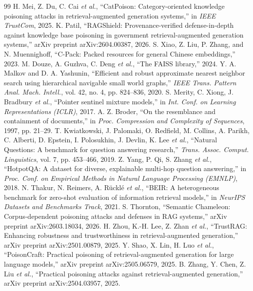 \documentclass[10pt,journal,compsoc]{IEEEtran}
\begin{document}
\begin{thebibliography}{99}
 H. Mei, Z. Du, C. Cai \emph{et al.}, ``CatPoison: Category-oriented knowledge poisoning attacks in retrieval-augmented generation systems,'' in \emph{IEEE TrustCom}, 2025.
 K. Patil, ``RAGShield: Provenance-verified defense-in-depth against knowledge base poisoning in government retrieval-augmented generation systems,'' arXiv preprint arXiv:2604.00387, 2026.
 S. Xiao, Z. Liu, P. Zhang, and N. Muennighoff, ``C-Pack: Packed resources for general Chinese embeddings,'' 2023.
 M. Douze, A. Guzhva, C. Deng \emph{et al.}, ``The FAISS library,'' 2024.
 Y. A. Malkov and D. A. Yashunin, ``Efficient and robust approximate nearest neighbor search using hierarchical navigable small world graphs,'' \emph{IEEE Trans. Pattern Anal. Mach. Intell.}, vol. 42, no. 4, pp. 824--836, 2020.
 S. Merity, C. Xiong, J. Bradbury \emph{et al.}, ``Pointer sentinel mixture models,'' in \emph{Int. Conf. on Learning Representations (ICLR)}, 2017.
 A. Z. Broder, ``On the resemblance and containment of documents,'' in \emph{Proc. Compression and Complexity of Sequences}, 1997, pp. 21--29.
 T. Kwiatkowski, J. Palomaki, O. Redfield, M. Collins, A. Parikh, C. Alberti, D. Epstein, I. Polosukhin, J. Devlin, K. Lee \emph{et al.}, ``Natural Questions: A benchmark for question answering research,'' \emph{Trans. Assoc. Comput. Linguistics}, vol. 7, pp. 453--466, 2019.
 Z. Yang, P. Qi, S. Zhang \emph{et al.}, ``HotpotQA: A dataset for diverse, explainable multi-hop question answering,'' in \emph{Proc. Conf. on Empirical Methods in Natural Language Processing (EMNLP)}, 2018.
 N. Thakur, N. Reimers, A. R\"{u}ckl\'{e} \emph{et al.}, ``BEIR: A heterogeneous benchmark for zero-shot evaluation of information retrieval models,'' in \emph{NeurIPS Datasets and Benchmarks Track}, 2021.
 S. Thornton, ``Semantic Chameleon: Corpus-dependent poisoning attacks and defenses in RAG systems,'' arXiv preprint arXiv:2603.18034, 2026.
 H. Zhou, K.-H. Lee, Z. Zhan \emph{et al.}, ``TrustRAG: Enhancing robustness and trustworthiness in retrieval-augmented generation,'' arXiv preprint arXiv:2501.00879, 2025.
 Y. Shao, X. Lin, H. Luo \emph{et al.}, ``PoisonCraft: Practical poisoning of retrieval-augmented generation for large language models,'' arXiv preprint arXiv:2505.06579, 2025.
 B. Zhang, Y. Chen, Z. Liu \emph{et al.}, ``Practical poisoning attacks against retrieval-augmented generation,'' arXiv preprint arXiv:2504.03957, 2025.

\end{thebibliography}
\end{document}
